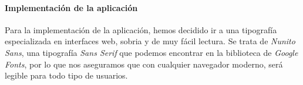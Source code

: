 \documentclass[../ei103948-project-documentation.tex]{subfiles}
\begin{document}
\begin{itemize}
\begin{itemize}
\begin{figure}[H]
                                                \begin{center}
                                                \end{center}
                                            \end{figure}
                                        \end{itemize}
                                \end{itemize}

                                \paragraph*{Implementación de la aplicación}
                                Para la implementación de la aplicación, hemos decidido ir a una tipografía especializada en interfaces web, sobria y de muy fácil lectura. Se trata de \textit{Nunito Sans}, una tipografía \textit{Sans Serif} que podemos encontrar en la biblioteca de \textit{Google Fonts}, por lo que nos aseguramos que con cualquier navegador moderno, será legible para todo tipo de usuarios.\\
                        
\end{document}
